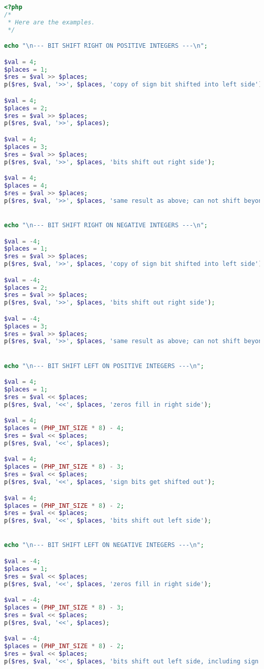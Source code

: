 \begin{lstlisting}[language=PHP]
<?php
/*
 * Here are the examples.
 */

echo "\n--- BIT SHIFT RIGHT ON POSITIVE INTEGERS ---\n";

$val = 4;
$places = 1;
$res = $val >> $places;
p($res, $val, '>>', $places, 'copy of sign bit shifted into left side');

$val = 4;
$places = 2;
$res = $val >> $places;
p($res, $val, '>>', $places);

$val = 4;
$places = 3;
$res = $val >> $places;
p($res, $val, '>>', $places, 'bits shift out right side');

$val = 4;
$places = 4;
$res = $val >> $places;
p($res, $val, '>>', $places, 'same result as above; can not shift beyond 0');


echo "\n--- BIT SHIFT RIGHT ON NEGATIVE INTEGERS ---\n";

$val = -4;
$places = 1;
$res = $val >> $places;
p($res, $val, '>>', $places, 'copy of sign bit shifted into left side');

$val = -4;
$places = 2;
$res = $val >> $places;
p($res, $val, '>>', $places, 'bits shift out right side');

$val = -4;
$places = 3;
$res = $val >> $places;
p($res, $val, '>>', $places, 'same result as above; can not shift beyond -1');


echo "\n--- BIT SHIFT LEFT ON POSITIVE INTEGERS ---\n";

$val = 4;
$places = 1;
$res = $val << $places;
p($res, $val, '<<', $places, 'zeros fill in right side');

$val = 4;
$places = (PHP_INT_SIZE * 8) - 4;
$res = $val << $places;
p($res, $val, '<<', $places);

$val = 4;
$places = (PHP_INT_SIZE * 8) - 3;
$res = $val << $places;
p($res, $val, '<<', $places, 'sign bits get shifted out');

$val = 4;
$places = (PHP_INT_SIZE * 8) - 2;
$res = $val << $places;
p($res, $val, '<<', $places, 'bits shift out left side');


echo "\n--- BIT SHIFT LEFT ON NEGATIVE INTEGERS ---\n";

$val = -4;
$places = 1;
$res = $val << $places;
p($res, $val, '<<', $places, 'zeros fill in right side');

$val = -4;
$places = (PHP_INT_SIZE * 8) - 3;
$res = $val << $places;
p($res, $val, '<<', $places);

$val = -4;
$places = (PHP_INT_SIZE * 8) - 2;
$res = $val << $places;
p($res, $val, '<<', $places, 'bits shift out left side, including sign bit');



\end{lstlisting}
